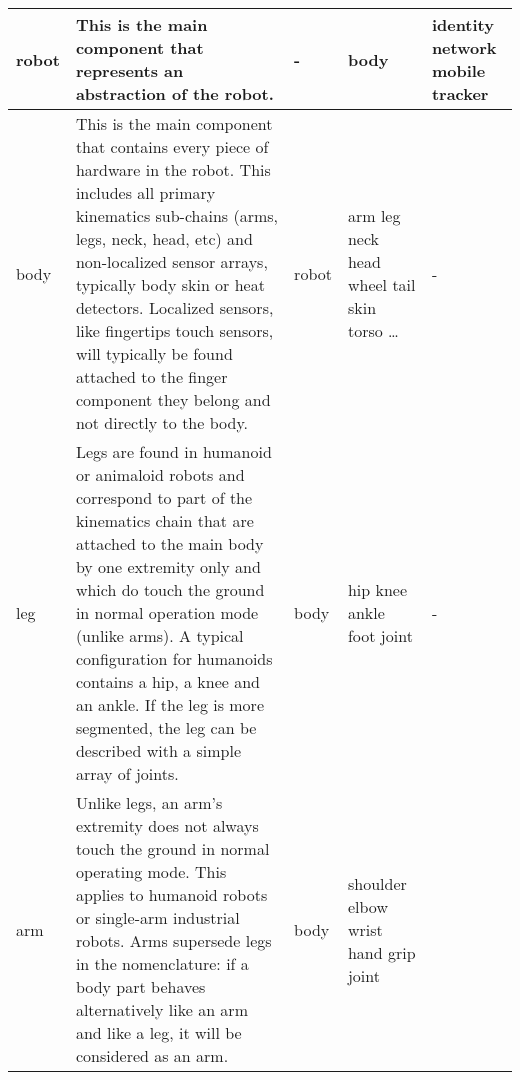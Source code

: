 \documentclass[a4paper]{article}
\begin{document}
\begin{center}
\begin{supertabular}{|m{2.312cm}|m{6.776cm}|m{2.629cm}|m{2.471cm}|m{2.1269999cm}|}
 robot &
\sffamily This is the main component that
represents an abstraction of the robot. &
\ttfamily {}- &
\ttfamily body &
\ttfamily identity network mobile
tracker\\\hline
{} body &
\sffamily This is the main component that
contains every piece of hardware in the robot. This includes all
primary kinematics sub-chains (arms, legs, neck, head, etc) and
non-localized sensor arrays, typically body skin or heat detectors.
Localized sensors, like fingertips touch sensors, will typically be
found attached to the finger component they belong and not directly to
the body.  &
\ttfamily robot &
\ttfamily arm leg neck head wheel tail skin
torso … &
\ttfamily {}-\\\hline
{} leg &
\sffamily Legs are found in humanoid or
animaloid robots and correspond to part of the kinematics chain that
are attached to the main body by one extremity only and which do touch
the ground in normal operation mode (unlike arms). A typical
configuration for humanoids contains a hip, a knee and an ankle. If the
leg is more segmented, the leg can be described with a simple array of
joints. &
\ttfamily body &
 hip knee ankle foot joint &
\ttfamily {}-\\\hline
{} arm &
\sffamily Unlike legs, an arm’s extremity does
not always touch the ground in normal operating mode. This applies to
humanoid robots or single-arm industrial robots. Arms supersede legs in
the nomenclature: if a body part behaves alternatively like an arm and
like a leg, it will be considered as an arm. &
\ttfamily body &
 shoulder elbow wrist hand grip  joint &

\end{supertabular}
\end{center}
\end{document}
